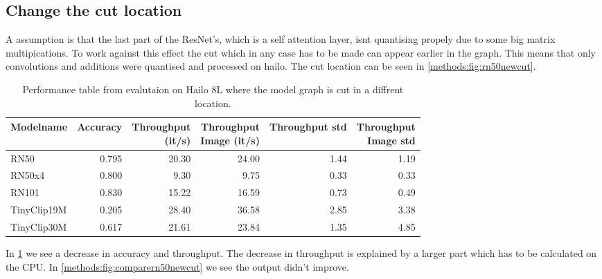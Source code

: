 \subsection{Change the cut location
\label{methods:sec:cutlocation}}
A assumption is that the last part of the ResNet's, which is a self attention layer, isnt quantising propely due to some big matrix multipications.
To work against this effect the cut which in any case has to be made can appear earlier in the graph.
This means that only convolutions and additions were quantised and processed on hailo.
The cut location can be seen in \cref{methods:fig:rn50newcut}.

\begin{table}[]
    \centering
    \begin{tabular}{l|rrrrr}
        \hline
        Modelname & Accuracy & \makecell{Throughput\\(it/s)} & \makecell{Throughput \\ Image (it/s)} & Throughput std & \makecell{Throughput\\Image std} \\ \hline
        RN50 & 0.795 & 20.30 & 24.00 & 1.44 & 1.19 \\ 
        RN50x4 & 0.800 & 9.30 & 9.75 & 0.33 & 0.33 \\ 
        RN101 & 0.830 & 15.22 & 16.59 & 0.73 & 0.49 \\ 
        TinyClip19M & 0.205 & 28.40 & 36.58 & 2.85 & 3.38 \\ 
        TinyClip30M & 0.617 & 21.61 & 23.84 & 1.35 & 4.85 \\ 
    \end{tabular}
    \caption{Performance table from evalutaion on Hailo 8L where the model graph is cut in a diffrent location.}
    \label{methods:tab:perfHailocut}
\end{table}

In \cref{methods:tab:perfHailocut} we see a decrease in accuracy and throughput.
The decrease in throughput is explained by a larger part which has to be calculated on the CPU.
In \cref{methods:fig:comparern50newcut} we see the output didn't improve.


